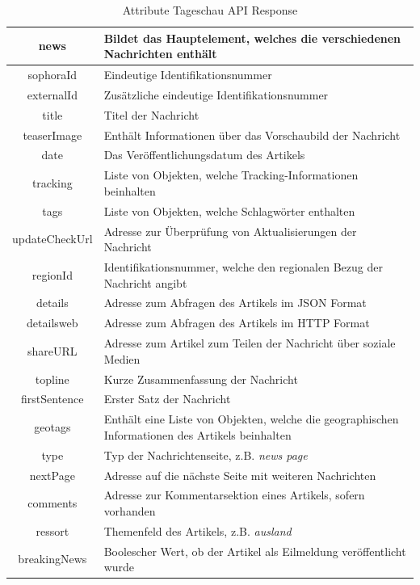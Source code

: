 \begin{table}   
    \centering
    \caption{Attribute Tageschau API Response}
    \label{tab:Attribute Tageschau API Response}
    \begin{tabular}{|c|p{11cm}|} \hline 
        news & Bildet das Hauptelement, welches die verschiedenen Nachrichten enthält \\ \hline 
        sophoraId & Eindeutige Identifikationsnummer \\ \hline 
        externalId & Zusätzliche eindeutige Identifikationsnummer \\ \hline 
        title & Titel der Nachricht \\ \hline 
        teaserImage & Enthält Informationen über das Vorschaubild der Nachricht \\ \hline 
        date & Das Veröffentlichungsdatum des Artikels \\ \hline 
        tracking & Liste von Objekten, welche Tracking-Informationen beinhalten\\ \hline 
        tags & Liste von Objekten, welche Schlagwörter enthalten \\ \hline 
        updateCheckUrl & Adresse zur Überprüfung von Aktualisierungen der Nachricht \\ \hline 
        regionId & Identifikationsnummer, welche den regionalen Bezug der Nachricht angibt \\ \hline 
        details & Adresse zum Abfragen des Artikels im JSON Format \\ \hline 
        detailsweb & Adresse zum Abfragen des Artikels im HTTP Format \\ \hline 
        shareURL & Adresse zum Artikel zum Teilen der Nachricht über soziale Medien \\ \hline 
        topline & Kurze Zusammenfassung der Nachricht \\ \hline 
        firstSentence & Erster Satz der Nachricht \\ \hline 
        geotags & Enthält eine Liste von Objekten, welche die geographischen Informationen des Artikels beinhalten \\ \hline 
        type & Typ der Nachrichtenseite, z.B. \textit{news page} \\ \hline 
        nextPage & Adresse auf die nächste Seite mit weiteren Nachrichten \\ \hline 
        comments & Adresse zur Kommentarsektion eines Artikels, sofern vorhanden \\ \hline 
        ressort & Themenfeld des Artikels, z.B. \textit{ausland} \\ \hline 
        breakingNews & Boolescher Wert, ob der Artikel als Eilmeldung veröffentlicht wurde \\ \hline
    \end{tabular}
\end{table}
